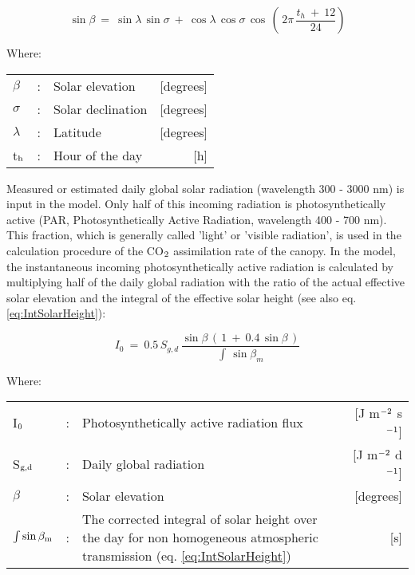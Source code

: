 \begin{equation}
\label{eq:5.7}
\sin \beta ~=~ \sin \lambda \, \sin \sigma ~+~ \cos \lambda \, \cos \sigma \, \cos \, 
(\, 2 \pi \,{\frac{t _{h} ~+~ 12}{24}} )
\end{equation}


Where:\\[5pt]
\begin{tabularx}{\textwidth}{llXr}
	$\beta$ &:& Solar elevation   &    [degrees]\\
	$\sigma$ &:& Solar declination    &    [degrees]\\
	$\lambda$ &:& Latitude     &   [degrees]\\
	t$_{{\rm h}}$ &:& Hour of the day    &    [h]\\
\end{tabularx}

Measured or estimated daily global solar radiation  (wavelength 300 - 3000 nm) is input
in the model. Only half of this incoming radiation is photosynthetically active (PAR,
Photosynthetically Active Radiation, wavelength 400 - 700 nm). This fraction, which is
generally called 'light' or 'visible radiation', is used in the calculation procedure of the
CO$_{{\rm 2}}$ assimilation rate of the canopy. In the model, the instantaneous incoming 
photosynthetically active radiation is calculated by multiplying half of the daily global radiation
with the ratio of the actual effective solar elevation and the integral of the effective solar
height (see also eq. \ref{eq:IntSolarHeight}):

\begin{equation}
\label{eq:5.8}
I _{0} ~=~ 0.5\, S _{g,d} \,{\frac{\sin \beta \, (\, 1~+~0.4\, \sin \beta \, )}{\int \, \sin \beta _{m} }}
\end{equation}

Where:\\[5pt]
\begin{tabularx}{\textwidth}{llXr}
	I$_{{\rm 0}}$ &:& Photosynthetically active radiation flux    &    
	[J m$^{{\rm -2}}$ s$^{{\rm -1}}$]\\
	S$_{{\rm g,d}}$ &:& Daily global radiation   &     
	[J m$^{{\rm -2}}$ d$^{{\rm -1}}$] \\
	$\beta$ &:& Solar elevation    &    [degrees]\\
	$\int \sin \beta_{{\rm m}}$ &:& The corrected integral of solar height over the day 
	for non homogeneous atmospheric transmission (eq. \ref{eq:IntSolarHeight})   
	&     [s]\\
\end{tabularx}

